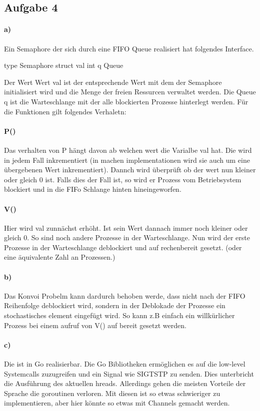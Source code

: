 \subsection*{Aufgabe 4}


\paragraph*{a)}

Ein Semaphore der sich durch eine FIFO Queue realisiert hat folgendes Interface.

type Semaphore struct {
val int
q Queue
}

Der Wert Wert val ist der entsprechende Wert mit dem der Semaphore initialisiert wird und die Menge der freien Ressurcen verwaltet werden. Die Queue q ist die Warteschlange mit der alle blockierten Prozesse hinterlegt werden. Für die Funktionen gilt folgendes Verhaletn:

\paragraph*{P()}
Das verhalten von P hängt davon ab welchen wert die Varialbe val hat. Die wird in jedem Fall inkrementiert (in machen implementationen wird sie auch um eine übergebenen Wert inkrementiert). Dannch wird überprüft ob der wert nun kleiner oder gleich 0 ist. Falls dies der Fall ist, so wird er Prozess vom Betriebsystem blockiert und in die FIFo Schlange hinten hineingeworfen.

\paragraph*{V()}
Hier wird val zunnächst erhöht. Ist sein Wert dannach immer noch kleiner oder gleich 0. So sind noch andere Prozesse in der Warteschlange. Nun wird der erste Prozesse in der Warteschlange deblockiert und auf rechenbereit gesetzt. (oder eine äquivalente Zahl an Prozessen.)


\paragraph*{b)}

Das Konvoi Probelm kann dardurch behoben werde, dass nicht nach der FIFO Reihenfolge deblockiert wird, sondern in der Deblokade der Prozesse ein stochastisches element eingefügt wird. So kann z.B einfach ein willkürlicher Prozess bei einem aufruf von V() auf bereit gesetzt werden.

\paragraph*{c)}

Die ist in Go realisierbar. Die Go Bibliotheken ermöglichen es auf die low-level Systemcalls zuzugreifen und ein Signal wie SIGTSTP zu senden. Dies unterbricht die Ausführung des aktuellen hreads. Allerdings gehen die meisten Vorteile der Sprache die goroutinen verloren. Mit diesen ist so etwas schwieriger zu implementieren, aber hier könnte so etwas mit Channels gemacht werden.

